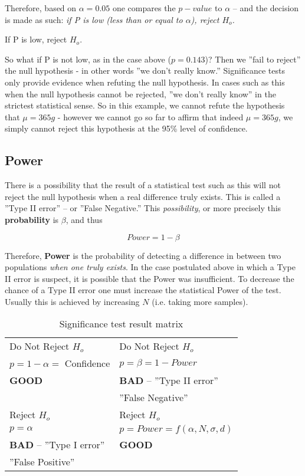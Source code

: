 Therefore, based on $\alpha = 0.05$ one compares the $p-value$ to $\alpha$ -- and the decision is made as such: \textit{if P is low (less than or equal to $\alpha$), reject $H_{o}$.}

\begin{center}
\LARGE If P is low, reject $H_{o}$.
\end{center}
So what if P is not low, as in the case above ($p = 0.143$)?  Then we ''fail to reject'' the null hypothesis - in other words ''we don't really know.''  Significance tests only provide evidence when refuting the null hypothesis.  In cases such as this when the null hypothesis cannot be rejected, ''we don't really know'' in the strictest statistical sense. So in this example, we cannot refute the hypothesis that  $ \mu = 365 g $ - however we cannot go so far to affirm that indeed  $ \mu = 365 g $, we simply cannot reject this hypothesis at the 95\% level of confidence.\\

\subsection{Power}
There is a possibility that the result of a statistical test such as this will not reject the null hypothesis when a real difference truly exists.  This is called a ''Type II error'' -- or ''False Negative.''  This \textit{possibility}, or more precisely this \textbf{probability} is $ \beta $, and thus

\begin{center}
\begin{equation}
Power = 1 - \beta
\end{equation} 
\end{center}
 Therefore, \textbf{Power} is the probability of detecting a difference in between two populations \textit{when one truly exists}. In the case postulated above in which a Type II error is suspect, it is possible that the Power was insufficient.  To decrease the chance of a Type II error one must increase the statistical Power of the test.  Usually this is achieved by increasing $N$ (i.e. taking more samples).
\begin{table}[h]\caption{Significance test result matrix}
\begin{center}
\begin{tabular}{|l|l|}
\hline   Do Not Reject $H_{o}$  &  Do Not Reject $H_{o}$   \\
 $p = 1-\alpha = $ Confidence & $p = \beta = 1-Power$ \\
  \textbf{GOOD} & \textbf{BAD} -- ''Type II error'' \\
  & ''False Negative'' \\
\hline Reject $H_{o}$ & Reject $H_{o}$ \\
 $ p = \alpha$ & $p= Power = f(\alpha, N, \sigma, d)$  \\
 \textbf{BAD} -- ''Type I error''    & \textbf{GOOD} \\
 ''False Positive''  &  \\
\hline 
\end{tabular} 
\end{center}
\end{table}
\newpage
